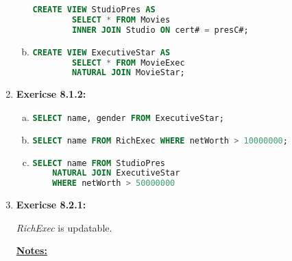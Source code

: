 \documentclass[12pt]{article}
\begin{document}
\begin{enumerate}[1.]
\begin{enumerate}[a)]
    \begin{lstlisting}[language=SQL]
    CREATE VIEW StudioPres AS
        SELECT * FROM Movies
        INNER JOIN Studio ON cert# = presC#;
    \end{lstlisting}

        \item

    \begin{lstlisting}[language=SQL]
    CREATE VIEW ExecutiveStar AS
        SELECT * FROM MovieExec
        NATURAL JOIN MovieStar;
    \end{lstlisting}
    \end{enumerate}

    \item \textbf{Exericse 8.1.2:}

    \begin{enumerate}[a)]
        \item

    \begin{lstlisting}[language=SQL]
    SELECT name, gender FROM ExecutiveStar;
    \end{lstlisting}

        \item

    \begin{lstlisting}[language=SQL]
    SELECT name FROM RichExec WHERE netWorth > 10000000;
    \end{lstlisting}

        \item

    \begin{lstlisting}[language=SQL]
    SELECT name FROM StudioPres
    NATURAL JOIN ExecutiveStar
    WHERE netWorth > 50000000
    \end{lstlisting}
    \end{enumerate}

    \item \textbf{Exericse 8.2.1:}

    \bigskip

    \textit{RichExec} is updatable.

    \underline{\textbf{Notes:}}

    \bigskip


\end{enumerate}
\end{document}
